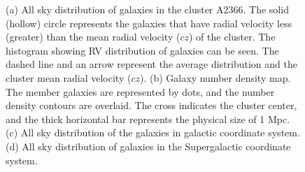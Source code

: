 \begin{figure}[H]
   \caption{(a) All sky distribution of galaxies in the cluster A2366. The solid (hollow) circle represents the galaxies that have radial velocity less (greater) than
      the mean radial velocity ($cz$) of the cluster. The histogram showing RV distribution of galaxies can be seen.
      The dashed line and an arrow represent the average distribution and the cluster mean radial velocity ($cz$).
      (b) Galaxy number density map. The member galaxies are represented by dots, and the number density contours are overlaid.
      The cross indicates the cluster center, and the thick horizontal bar represents the physical size of 1 Mpc.
    (c) All sky distribution of the galaxies in galactic coordinate system. (d) All sky distribution of galaxies in the Supergalactic coordinate system.}
\end{figure}
